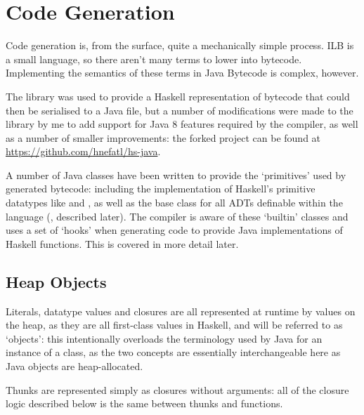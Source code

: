 \documentclass[dissertation.tex]{subfiles}
\begin{document}
\section{Code Generation}
{
    
    Code generation is, from the surface, quite a mechanically simple process. ILB is a small language, so there
    aren't many terms to lower into bytecode. Implementing the semantics of these terms in Java Bytecode is complex,
    however.

    The  library was used to provide a Haskell representation of bytecode that could then be
    serialised to a Java  file, but a number of modifications were made to the library by me to
    add support for Java 8 features required by the compiler, as well as a number of smaller improvements: the
    forked project can be found at \url{https://github.com/hnefatl/hs-java}.

    A number of Java classes have been written to provide the `primitives' used by generated bytecode: including the
    implementation of Haskell's primitive datatypes like  and , as well as the base class
    for all ADTs definable within the language (, described later). The compiler is aware of
    these `builtin' classes and uses a set of `hooks' when generating code to provide Java implementations of
    Haskell functions. This is covered in more detail later.

    \subsection{Heap Objects}\label{sec:heap-objects}
    {


        Literals, datatype values and closures are all represented at runtime by values on the heap, as they are all
        first-class values in Haskell, and will be referred to as `objects': this intentionally overloads the
        terminology used by Java for an instance of a class, as the two concepts are essentially interchangeable
        here as Java objects are heap-allocated.

        Thunks are represented simply as closures without arguments: all of the closure logic described below is the
        same between thunks and functions.

}}
\end{document}
